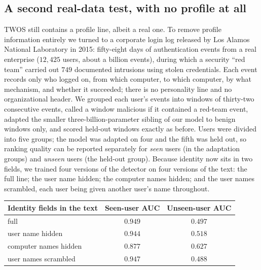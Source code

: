 \documentclass[10pt]{article}
\begin{document}
\subsection{A second real-data test, with no profile at all}
\label{sec:plain-lanl}

TWOS still contains a profile line, albeit a real one. To remove profile
information entirely we turned to a corporate login log released by Los
Alamos National Laboratory in 2015: fifty-eight days of authentication
events from a real enterprise ($12{,}425$ users, about a billion events),
during which a security ``red team'' carried out $749$ documented
intrusions using stolen credentials. Each event records only who logged
on, from which computer, to which computer, by what mechanism, and whether
it succeeded; there is no personality line and no organizational header.
We grouped each user's events into windows of thirty-two consecutive
events, called a window malicious if it contained a red-team event,
adapted the smaller three-billion-parameter sibling of our model to
benign windows only, and scored held-out windows exactly as before. Users
were divided into five groups; the model was adapted on four and the
fifth was held out, so ranking quality can be reported separately for
\emph{seen} users (in the adaptation groups) and \emph{unseen} users (the
held-out group). Because identity now sits in two fields, we trained four
versions of the detector on four versions of the text: the full line; the
user name hidden; the computer names hidden; and the user names scrambled,
each user being given another user's name throughout.

\begin{center}
\begin{tabular}{lcc}
\toprule
Identity fields in the text & Seen-user AUC & Unseen-user AUC \\
\midrule
full                  & $0.949$ & $0.497$ \\
user name hidden      & $0.944$ & $0.518$ \\
computer names hidden & $0.877$ & $\mathbf{0.627}$ \\
user names scrambled  & $0.947$ & $0.488$ \\
\bottomrule
\end{tabular}
\end{center}
\end{document}
